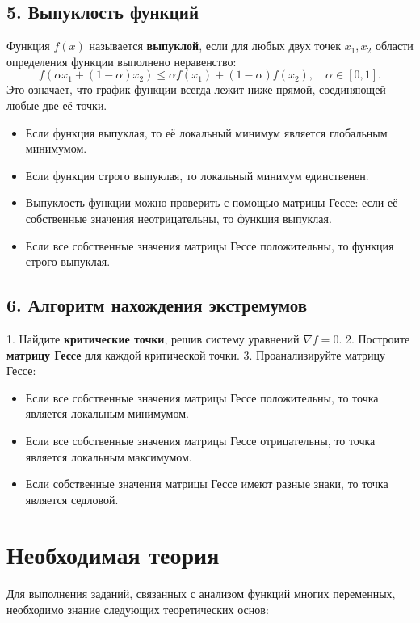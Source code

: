 \documentclass[a4paper,12pt]{article}
\begin{document}
\subsection*{5. Выпуклость функций}

Функция \( f(x) \) называется \textbf{выпуклой}, если для любых двух точек \( x_1, x_2 \) области определения функции выполнено неравенство:
\[
f(\alpha x_1 + (1-\alpha)x_2) \leq \alpha f(x_1) + (1-\alpha) f(x_2), \quad \alpha \in [0, 1].
\]
Это означает, что график функции всегда лежит ниже прямой, соединяющей любые две её точки.

\begin{itemize}
    \item Если функция выпуклая, то её локальный минимум является глобальным минимумом.
    \item Если функция строго выпуклая, то локальный минимум единственен.
    \item Выпуклость функции можно проверить с помощью матрицы Гессе: если её собственные значения неотрицательны, то функция выпуклая.
    \item Если все собственные значения матрицы Гессе положительны, то функция строго выпуклая.
\end{itemize}

\subsection*{6. Алгоритм нахождения экстремумов}

1. Найдите \textbf{критические точки}, решив систему уравнений \( \nabla f = 0 \).
2. Построите \textbf{матрицу Гессе} для каждой критической точки.
3. Проанализируйте матрицу Гессе:
    \begin{itemize}
        \item Если все собственные значения матрицы Гессе положительны, то точка является локальным минимумом.
        \item Если все собственные значения матрицы Гессе отрицательны, то точка является локальным максимумом.
        \item Если собственные значения матрицы Гессе имеют разные знаки, то точка является седловой.
    \end{itemize}\section*{Необходимая теория}

Для выполнения заданий, связанных с анализом функций многих переменных, необходимо знание следующих теоретических основ:
\end{document}
